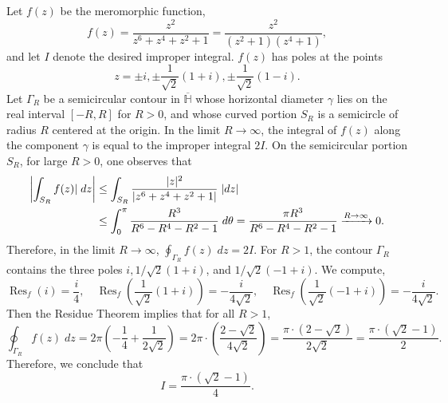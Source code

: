 \documentclass{article}
\begin{document}
	Let $f(z)$ be the meromorphic function, 
	\begin{equation*}
		f(z) = \frac{z^{2}}{z^{6} + z^{4} + z^{2} + 1} = \frac{z^{2}}{(z^{2} + 1)(z^{4} + 1)}, 
	\end{equation*}
	and let $I$ denote the desired improper integral. $f(z)$ has poles at the points 
	\begin{equation*}
		z = \pm i, \pm \frac{1}{\sqrt{2}}\left(1 + i\right), \pm \frac{1}{\sqrt{2}}(1 - i). 
	\end{equation*}
	Let $\Gamma_{R}$ be a semicircular contour in $\overline{\mathbb{H}}$ whose horizontal diameter $\gamma$ lies on the real interval $[-R,R]$ for $R > 0$, and whose curved portion $S_{R}$ is a semicircle of radius $R$ centered at the origin. In the limit $R \to \infty$, the integral of $f(z)$ along the component $\gamma$ is equal to the improper integral $2I$. On the semicircular portion $S_{R}$, for large $R > 0$, one observes that 
	\begin{align*}
		\begin{split}
			\left| \int_{S_{R}}f(z)|\;dz \right| &\leq \int_{S_{R}}\frac{|z|^{2}}{|z^{6} + z^{4} + z^{2} + 1|}\;|dz| \\
			&\leq \int_{0}^{\pi}\frac{R^{3}}{R^{6} - R^{4} - R^{2} - 1}\;d\theta = \frac{\pi R^{3}}{R^{6} -R^{4} - R^{2} - 1} \xrightarrow{R \to \infty} 0. 
		\end{split}
	\end{align*}
	Therefore, in the limit $R \to \infty$, $\oint_{\Gamma_{R}}f(z)\;dz = 2I$. For $R > 1$, the contour $\Gamma_{R}$ contains the three poles $i, 1/\sqrt{2}(1 + i)$, and $1/\sqrt{2}(-1 + i)$. We compute, 
	\begin{equation*}
		\operatorname{Res}_{f}(i) = \frac{i}{4}, \quad \operatorname{Res}_{f}\left(\frac{1}{\sqrt{2}}(1 + i)\right) = -\frac{i}{4\sqrt{2}}, \quad \operatorname{Res}_{f}\left(\frac{1}{\sqrt{2}}(-1 + i)\right) = -\frac{i}{4\sqrt{2}}. 
	\end{equation*}
	Then the Residue Theorem implies that for all $R > 1$, 
	\begin{equation*}
		\oint_{\Gamma_{R}}f(z)\;dz = 2\pi \left(-\frac{1}{4} + \frac{1}{2\sqrt{2}}\right) = 2\pi \cdot \left(\frac{2 - \sqrt{2}}{4\sqrt{2}}\right) = \frac{\pi \cdot (2 - \sqrt{2})}{2\sqrt{2}} = \frac{\pi \cdot (\sqrt{2} - 1)}{2}. 
	\end{equation*}
	Therefore, we conclude that 
	\begin{equation*}
		I = \frac{\pi \cdot (\sqrt{2} - 1)}{4}. 
	\end{equation*}
	
\end{document}
